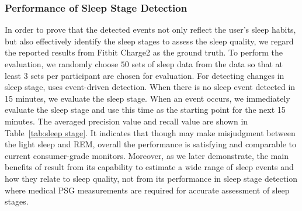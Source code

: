 \subsubsection{Performance of Sleep Stage Detection}

In order to prove that the detected events not only reflect the user's sleep habits, but also effectively identify the sleep stages to assess the sleep quality, we regard the reported results from Fitbit Charge2 as the ground truth. To perform the evaluation, we randomly choose $50$ sets of sleep data from the data so that at least $3$ sets per participant are chosen for evaluation. For detecting changes in sleep stage, {\systemname} uses event-driven detection. When there is no sleep event detected in 15 minutes, we evaluate the sleep stage. When an event occurs, we immediately evaluate the sleep stage and use this time as the starting point for the next 15 minutes. The averaged precision value and recall value are shown in Table~\ref{tab:sleep stage}. It indicates that though {\systemname} may make misjudgment between the light sleep and REM, overall the performance is satisfying and comparable to current consumer-grade monitors. Moreover, as we later demonstrate, the main benefits of {\systemname} result from its capability to estimate a wide range of sleep events and how they relate to sleep quality, not from its performance in sleep stage detection where medical PSG measurements are required for accurate assessment of sleep stages.

